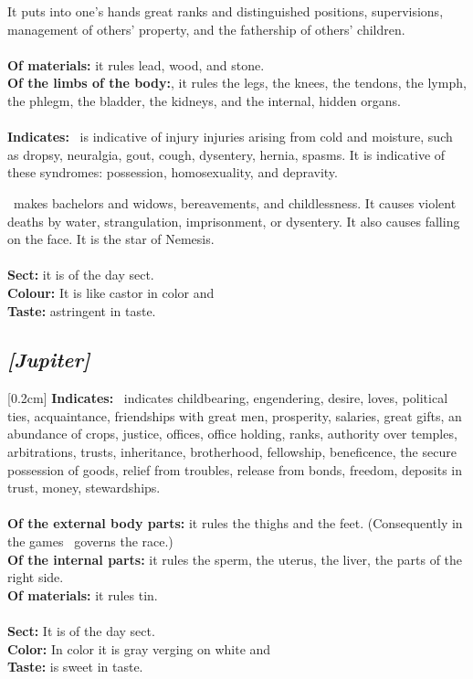 It puts into one’s hands great ranks and distinguished positions, supervisions, management of others’ property, and the fathership of others’ children. \\
\\
\textbf{Of materials:} it rules lead, wood, and stone. \\
\textbf{Of the limbs of the body:}, it rules the legs, the knees, the tendons, the lymph, the phlegm, the bladder, the kidneys, and the internal, hidden organs. \\
\\
\textbf{Indicates:} \Saturn\, is indicative of injury injuries arising from cold and moisture, such as dropsy, neuralgia, gout, cough, dysentery, hernia, spasms. It is indicative of these syndromes: possession, homosexuality, and depravity. 

\Saturn\, makes bachelors and widows, bereavements, and childlessness. It causes violent deaths by water, strangulation, imprisonment, or dysentery. It also causes falling on the face. It is the star of Nemesis. \\
\\
\textbf{Sect:} it is of the day sect.\\
\textbf{Colour:} It is like castor in color and \\
\textbf{Taste:} astringent in taste.

\secbr
\subsection{\textit{[Jupiter]}}
[0.2cm]
\noindent
{}
\textbf{Indicates:} \Jupiter\,  indicates childbearing, engendering, desire, loves, political ties, acquaintance, friendships with great men, prosperity, salaries, great gifts, an abundance of crops, justice, offices, office holding, ranks, authority over temples, arbitrations, trusts, inheritance, brotherhood, fellowship, beneficence, the secure possession of goods, relief from troubles, release from bonds, freedom, deposits in trust, money, stewardships. \\
\\
\textbf{Of the external body parts:} it rules the thighs and the feet. (Consequently in the games \Jupiter\, governs the race.)\\
\textbf{Of the internal parts:}  it rules the sperm, the uterus, the liver, the parts of the right side. \\
\textbf{Of materials:} it rules tin. \\
\\
\textbf{Sect:} It is of the day sect. \\
\textbf{Color:} In color it is 
gray verging on white and \\
\textbf{Taste:} is 
sweet in taste.

